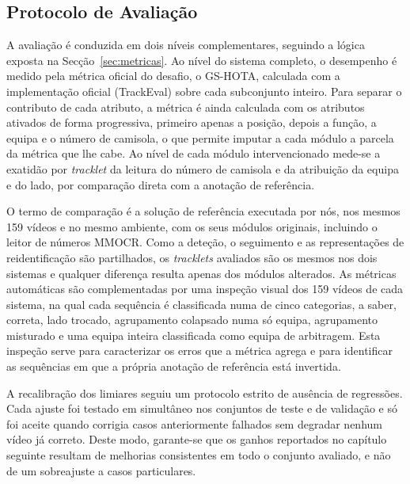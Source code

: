 \subsection{Protocolo de Avaliação}\label{sec:protocolo}

A avaliação é conduzida em dois níveis complementares, seguindo a lógica exposta na
Secção~\ref{sec:metricas}. Ao nível do sistema completo, o desempenho é medido pela métrica oficial
do desafio, o GS-HOTA, calculada com a implementação oficial (TrackEval) sobre cada subconjunto
inteiro. Para separar o contributo de cada atributo, a métrica é ainda calculada com os atributos
ativados de forma progressiva, primeiro apenas a posição, depois a função, a equipa e o número de
camisola, o que permite imputar a cada módulo a parcela da métrica que lhe cabe. Ao nível de cada
módulo intervencionado mede-se a exatidão por \emph{tracklet} da leitura do número de camisola e da
atribuição da equipa e do lado, por comparação direta com a anotação de referência.

O termo de comparação é a solução de referência executada por nós, nos mesmos 159 vídeos e no mesmo
ambiente, com os seus módulos originais, incluindo o leitor de números MMOCR. Como a deteção, o
seguimento e as representações de reidentificação são partilhados, os \emph{tracklets} avaliados são
os mesmos nos dois sistemas e qualquer diferença resulta apenas dos módulos alterados. As métricas
automáticas são complementadas por uma inspeção visual dos 159 vídeos de cada sistema, na qual cada
sequência é classificada numa de cinco categorias, a saber, correta, lado trocado, agrupamento colapsado numa
só equipa, agrupamento misturado e uma equipa inteira classificada como equipa de arbitragem. Esta
inspeção serve para caracterizar os erros que a métrica agrega e para identificar as sequências em
que a própria anotação de referência está invertida.

A recalibração dos limiares seguiu um protocolo estrito de ausência de regressões. Cada ajuste foi
testado em simultâneo nos conjuntos de teste e de validação e só foi aceite quando corrigia casos
anteriormente falhados sem degradar nenhum vídeo já correto. Deste modo, garante-se que os ganhos
reportados no capítulo seguinte resultam de melhorias consistentes em todo o conjunto avaliado, e não
de um sobreajuste a casos particulares.
